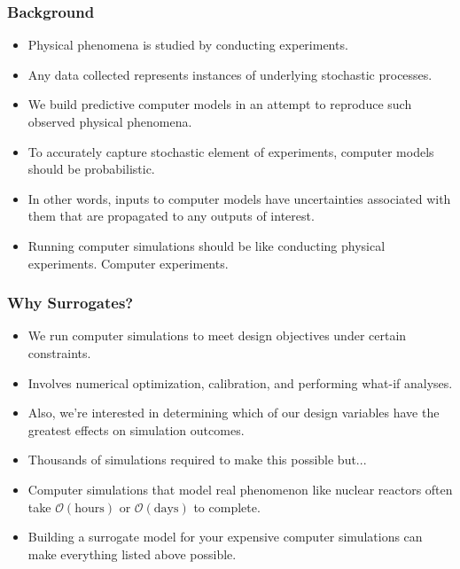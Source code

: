 \begin{frame}
\frametitle{Background}

\begin{itemize}
  \item Physical phenomena is studied by conducting experiments. 
  \item Any data collected represents instances of underlying stochastic processes.  
  \item We build predictive computer models in an attempt to reproduce such observed physical phenomena.
  \item To accurately capture stochastic element of experiments, computer models should be probabilistic.  
  \item In other words, inputs to computer models have uncertainties associated with them that are propagated to any outputs of interest.
  \item Running computer simulations should be like conducting physical experiments. Computer experiments.      
\end{itemize}

\end{frame}
\begin{frame}
\frametitle{Why Surrogates?}

\begin{itemize}
  \item We run computer simulations to meet design objectives under certain constraints. 
  \item Involves numerical optimization, calibration, and performing what-if analyses.
  \item Also, we're interested in determining which of our design variables have the greatest effects on simulation outcomes. 
  \item Thousands of simulations required to make this possible but...  
  \item Computer simulations that model real phenomenon like nuclear reactors often take $\mathcal{O}(\mbox{hours})$ or $\mathcal{O}(\mbox{days})$ to complete.
  \item Building a surrogate model for your expensive computer simulations can make everything listed above possible.   
\end{itemize}

\end{frame}
